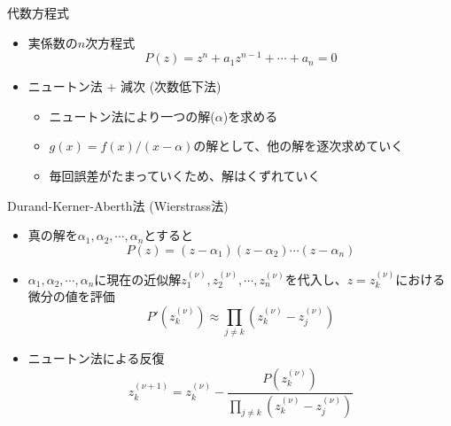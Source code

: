 \documentclass[dvipdfmx]{beamer}
\begin{document}
\begin{frame}[t,fragile]{代数方程式}
  \begin{itemize}
    \setlength{\itemsep}{1em}
  \item 実係数の$n$次方程式
    \[
    P(z) = z^n + a_1 z^{n-1} + \cdots + a_n = 0
    \]
  \item ニュートン法 + 減次 (次数低下法)
    \begin{itemize}
    \item ニュートン法により一つの解($\alpha$)を求める
    \item $g(x) = f(x) / (x-\alpha)$の解として、他の解を逐次求めていく
    \item 毎回誤差がたまっていくため、解はくずれていく
    \end{itemize}
  \end{itemize}
\end{frame}


\begin{frame}[t,fragile]{Durand-Kerner-Aberth法 (Wierstrass法)}
  \begin{itemize}
    \setlength{\itemsep}{1em}
  \item 真の解を$\alpha_1,\alpha_2,\cdots,\alpha_n$とすると
    \[
    P(z) = (z-\alpha_1) (z-\alpha_2) \cdots (z-\alpha_n)
    \]
  \item $\alpha_1,\alpha_2,\cdots,\alpha_n$に現在の近似解$z^{(\nu)}_1,z^{(\nu)}_2,\cdots,z^{(\nu)}_n$を代入し、$z=z^{(\nu)}_k$における微分の値を評価
    \[
    P'(z^{(\nu)}_k) \approx \prod_{j \ne k} (z^{(\nu)}_k - z^{(\nu)}_j)
    \]
  \item ニュートン法による反復
    \[
    z^{(\nu+1)}_k = z^{(\nu)}_k - \frac{P(z^{(\nu)}_k)}{\prod_{j \ne k} (z^{(\nu)}_k - z^{(\nu)}_j)}
    \]
  \end{itemize}
\end{frame}
\end{document}
